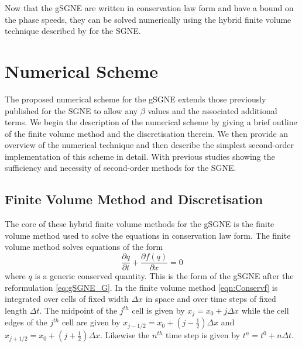 \documentclass[10pt]{elsarticle}
\begin{document}
Now that the gSGNE are written in conservation law form and have a bound on the phase speeds, they can be solved numerically using the hybrid finite volume technique described by \citet{Zoppou-etal-2017} for the SGNE.

\section{Numerical Scheme}
The proposed numerical scheme for the gSGNE extends those previously published for the SGNE \cite{Zoppou-etal-2017,Hank-etal-2010-2034} to allow any $\beta$ values and the associated additional terms. We begin the description of the numerical scheme by giving a brief outline of the finite volume method and the discretisation therein. We then provide an overview of the numerical technique and then describe the simplest second-order implementation of this scheme in detail. With previous studies \cite{Zoppou-etal-2017,Pitt-2019} showing the sufficiency and necessity of second-order methods for the SGNE. 

\subsection{Finite Volume Method and Discretisation}
The core of these hybrid finite volume methods for the gSGNE is the finite volume method used to solve the equations in conservation law form. The finite volume method solves equations of the form 
\begin{equation}
\label{eqn:Conservf}
\frac{\partial q}{\partial t} + \frac{\partial f(q)}{\partial x} = 0
\end{equation}
where $q$ is a generic conserved quantity. This is the form of the gSGNE after the reformulation \eqref{eq:gSGNE_G}. In the finite volume method \eqref{eqn:Conservf} is integrated over cells of fixed width $\Delta x$ in space and over time steps of fixed length $\Delta t$.  The midpoint of the $j^{th}$ cell is given by $x_j = x_0 + j \Delta x$ while the cell edges of the $j^{th}$ cell are given by $x_{j-1/2} = x_0 + (j - \frac{1}{2}) \Delta x$ and $x_{j+1/2} = x_0 + (j + \frac{1}{2}) \Delta x$. Likewise the $n^{th}$ time step is given by $t^n = t^0 + n \Delta t$. 
\end{document}

